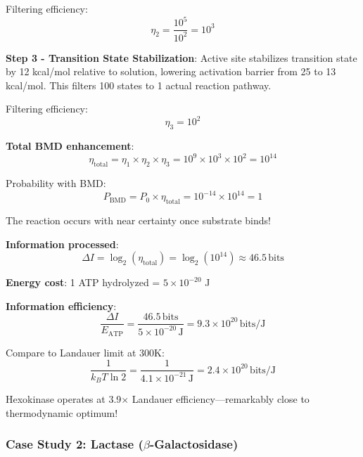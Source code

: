 \documentclass[11pt,onecolumn]{article}
\begin{document}
Filtering efficiency:
\begin{equation}
\eta_2 = \frac{10^5}{10^2} = 10^3
\end{equation}

\textbf{Step 3 - Transition State Stabilization}: Active site stabilizes transition state by 12 kcal/mol relative to solution, lowering activation barrier from 25 to 13 kcal/mol. This filters 100 states to 1 actual reaction pathway.

Filtering efficiency:
\begin{equation}
\eta_3 = 10^2
\end{equation}

\textbf{Total BMD enhancement}:
\begin{equation}
\eta_{\text{total}} = \eta_1 \times \eta_2 \times \eta_3 = 10^9 \times 10^3 \times 10^2 = 10^{14}
\end{equation}

Probability with BMD:
\begin{equation}
P_{\text{BMD}} = P_0 \times \eta_{\text{total}} = 10^{-14} \times 10^{14} = 1
\end{equation}

The reaction occurs with near certainty once substrate binds!

\textbf{Information processed}:
\begin{equation}
\Delta I = \log_2(\eta_{\text{total}}) = \log_2(10^{14}) \approx 46.5\,\text{bits}
\end{equation}

\textbf{Energy cost}: 1 ATP hydrolyzed = $5 \times 10^{-20}$ J

\textbf{Information efficiency}:
\begin{equation}
\frac{\Delta I}{E_{\text{ATP}}} = \frac{46.5\,\text{bits}}{5 \times 10^{-20}\,\text{J}} = 9.3 \times 10^{20}\,\text{bits/J}
\end{equation}

Compare to Landauer limit at 300K:
\begin{equation}
\frac{1}{k_B T \ln 2} = \frac{1}{4.1 \times 10^{-21}\,\text{J}} = 2.4 \times 10^{20}\,\text{bits/J}
\end{equation}

Hexokinase operates at 3.9$\times$ Landauer efficiency---remarkably close to thermodynamic optimum!

\subsubsection{Case Study 2: Lactase ($\beta$-Galactosidase)}
\end{document}
